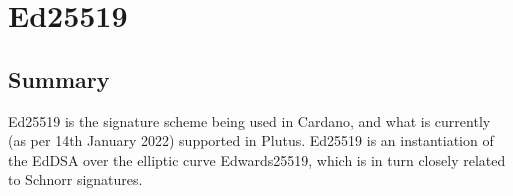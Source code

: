 \section{Ed25519}
\newcommand{\keygen}{\texttt{KeyGen}}
\newcommand{\sign}{\texttt{Sign}}
\newcommand{\verify}{\texttt{Verify}}
\newcommand{\secparam}{\lambda}
\newcommand{\secretkey}{x}
\newcommand{\signingkey}{sk}
\newcommand{\vk}{vk}
\newcommand{\signature}{\sigma}


\newcommand{\ec}{E}
\newcommand{\cofvar}{\texttt{cofvar}}
\newcommand{\group}{\mathbf{G}}
\newcommand{\generator}{G}
\newcommand{\order}{q}
\newcommand{\hash}{\texttt{H}}

\subsection{Summary}
Ed25519 is the signature scheme being used in Cardano, and what is currently (as per 14th January 2022) supported in Plutus. Ed25519 is an instantiation of the EdDSA over the elliptic curve Edwards25519, which is in turn closely related to Schnorr signatures. 
